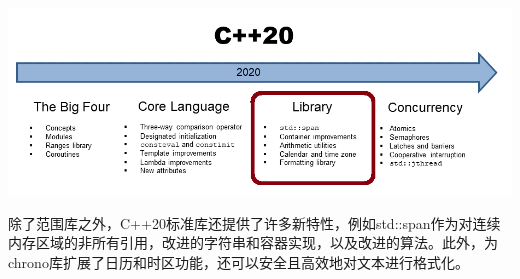 
\begin{center}
\includegraphics[width=1.0\textwidth]{content/3/chapter5/images/1.png}\\
\end{center}

除了范围库之外，C++20标准库还提供了许多新特性，例如std::span作为对连续内存区域的非所有引用，改进的字符串和容器实现，以及改进的算法。此外，为chrono库扩展了日历和时区功能，还可以安全且高效地对文本进行格式化。